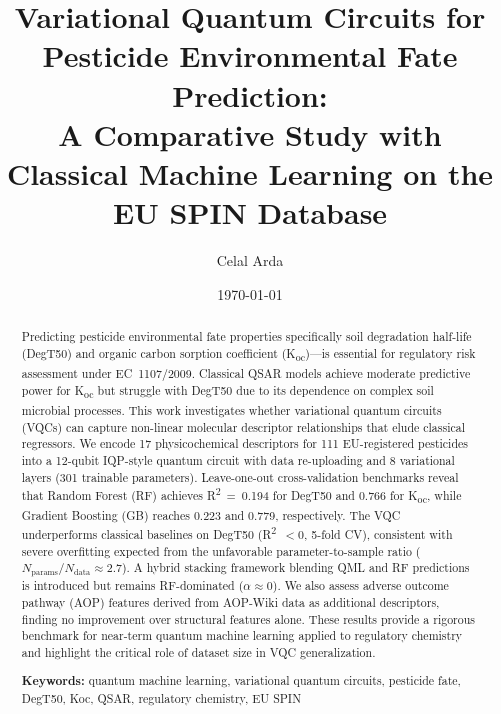 \documentclass[12pt,a4paper]{article}
\newcommand{\degtl}{DegT50}
\newcommand{\koc}{K\textsubscript{oc}}
\newcommand{\rtwo}{R\textsuperscript{2}}
\newcommand{\nqubits}{12}
\newcommand{\nlayers}{8}
\newcommand{\nparams}{301}
\newcommand{\nsub}{111}
\newcommand{\nfeat}{17}
\begin{document}
\title{Variational Quantum Circuits for Pesticide Environmental Fate Prediction:\\
       A Comparative Study with Classical Machine Learning on the EU SPIN Database}

\author{Celal Arda }

\date{\today}
\maketitle

\begin{abstract}
Predicting pesticide environmental fate properties specifically soil
degradation half-life (\degtl{}) and organic carbon sorption coefficient
(\koc{})—is essential for regulatory risk assessment under EC~1107/2009.
Classical QSAR models achieve moderate predictive power for \koc{} but
struggle with \degtl{} due to its dependence on complex soil microbial
processes. This work investigates whether variational quantum circuits (VQCs)
can capture non-linear molecular descriptor relationships that elude
classical regressors. We encode \nfeat{} physicochemical descriptors for
\nsub{} EU-registered pesticides into a \nqubits{}-qubit IQP-style quantum
circuit with data re-uploading and \nlayers{} variational layers (\nparams{}
trainable parameters). Leave-one-out cross-validation benchmarks reveal that
Random Forest (RF) achieves \rtwo{}~=~0.194 for \degtl{} and 0.766 for
\koc{}, while Gradient Boosting (GB) reaches 0.223 and 0.779, respectively.
The VQC underperforms classical baselines on \degtl{} (\rtwo{}~$< 0$, 5-fold
CV), consistent with severe overfitting expected from the unfavorable
parameter-to-sample ratio ($N_\text{params}/N_\text{data} \approx 2.7$).
A hybrid stacking framework blending QML and RF predictions is introduced
but remains RF-dominated ($\alpha \approx 0$). We also assess adverse
outcome pathway (AOP) features derived from AOP-Wiki data as additional
descriptors, finding no improvement over structural features alone. These
results provide a rigorous benchmark for near-term quantum machine learning
applied to regulatory chemistry and highlight the critical role of dataset
size in VQC generalization.

\vspace{6pt}
\noindent\textbf{Keywords:} quantum machine learning, variational quantum
circuits, pesticide fate, DegT50, Koc, QSAR, regulatory chemistry, EU SPIN
\end{abstract}
\end{document}
